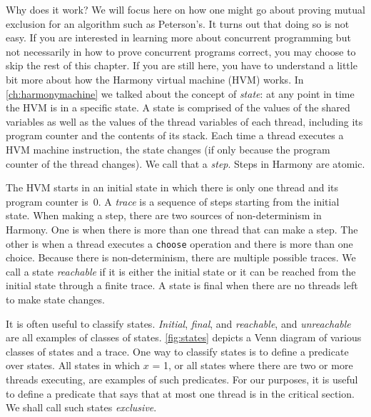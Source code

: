 \documentclass{report}
\begin{document}
%
%

Why does it work?  We will focus here on how one might go about proving
mutual exclusion for an algorithm such as Peterson's.
It turns out that doing so is not easy.
If you are interested in learning more about concurrent programming
but not necessarily in how to prove concurrent programs correct, you
may choose to skip the rest of this chapter.
If you are still here, you have to understand a little bit more about
how the Harmony virtual machine (HVM) works.
In \autoref{ch:harmonymachine} we talked about the concept of \emph{state}:
%
at any point in time the HVM is in a specific state.
A state is comprised of the values of the shared variables as well as
the values of the thread variables
%
of each thread, including its
program counter and the contents of its stack.
Each time a thread executes a HVM machine instruction, the
state changes (if only because the program counter of the thread
changes).  We call that a \emph{step}.
%
Steps in Harmony are atomic.

%
%

The HVM starts in an initial state in which there is only
one thread and its program counter is~0.  A \emph{trace}
%
is a sequence of steps starting from the initial state.
When making a step, there are two sources of non-determinism
%
in Harmony.
One is when
there is more than one thread that can make a step.  The other is
when a thread executes a \texttt{choose} operation and there is
more than one choice.
Because there is non-determinism, there are multiple possible traces.
We call a state \emph{reachable}
%
if it is either the initial state
or it can be reached from the initial state through a finite trace.
A state is final
when there are no threads left to make state changes.

It is often useful to classify states.
\emph{Initial}, \emph{final}, and \emph{reachable}, and \emph{unreachable}
are all examples of classes of states.
\autoref{fig:states} depicts a Venn diagram of various classes of states
and a trace.
One way to classify states is to define a predicate over states.
All states in which $x$ = 1, or all states where
there are two or more threads executing, are examples of such predicates.
For our purposes, it is useful to define a predicate that says that at
most one thread is in the critical section.  We shall call such states
\emph{exclusive}.
\end{document}
